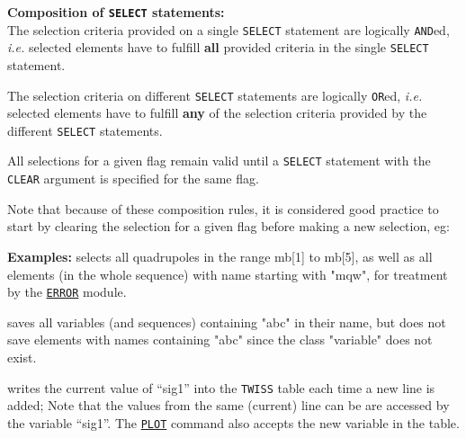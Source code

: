 \vskip 5mm
\textbf{Composition of \texttt{SELECT} statements:} \\
The selection criteria provided on a single \texttt{SELECT} statement
are logically \texttt{AND}ed, \textsl{i.e.} selected elements have to
fulfill \textbf{all} provided criteria in the single \texttt{SELECT}
statement. 

The selection criteria on different \texttt{SELECT} statements are
logically \texttt{OR}ed, \textsl{i.e.} selected elements have to fulfill
\textbf{any} of the selection criteria provided by the different
\texttt{SELECT} statements. 

All selections for a given flag remain valid until a \texttt{SELECT}
statement with the \texttt{CLEAR} argument is specified for the same flag.

Note that because of these composition rules, it is considered good
practice to start by clearing the selection for a given flag before
making a new selection, eg: 


\vskip 5mm
\textbf{Examples:} 
selects all quadrupoles in the range mb[1] to mb[5], as well as all
elements (in the whole sequence) with name starting with "mqw", for 
treatment by the \hyperref[chap:error]{\texttt{ERROR}} module.  

\vskip 5mm
saves all variables (and sequences) containing "abc" in their name, 
but does not save elements with names containing "abc" since the class
"variable" does not exist.  

\vskip 5mm
writes the current value of ``sig1'' into the \texttt{TWISS} table each
time a new line is added; Note that the values from the same (current)
line can be are accessed by the variable ``sig1''.
The \hyperref[chap:plot]{\texttt{PLOT}} command also accepts the new variable 
in the table.  



